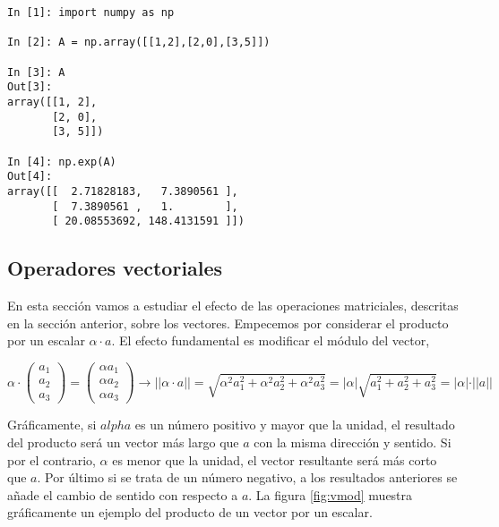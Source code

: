 \begin{center}
    \begin{minipage}{0.5\textwidth}
        \begin{verbatim}
In [1]: import numpy as np

In [2]: A = np.array([[1,2],[2,0],[3,5]])

In [3]: A
Out[3]: 
array([[1, 2],
       [2, 0],
       [3, 5]])

In [4]: np.exp(A)
Out[4]: 
array([[  2.71828183,   7.3890561 ],
       [  7.3890561 ,   1.        ],
       [ 20.08553692, 148.4131591 ]])
        \end{verbatim}
    \end{minipage}
\end{center}

\begin{paracol}{2}
\section{Operadores vectoriales}\label{opvect}
En esta sección vamos a estudiar el efecto de las operaciones matriciales, descritas en la sección anterior, sobre los vectores. Empecemos por considerar el producto por un escalar $\alpha \cdot a$. El efecto fundamental es modificar el módulo del vector,
\end{paracol}
\begin{equation*}
\alpha \cdot \begin{pmatrix}
a_1\\
a_2\\
a_3
\end{pmatrix}=
\begin{pmatrix}
\alpha a_1\\
\alpha a_2\\
\alpha a_3
\end{pmatrix}\rightarrow \vert \vert \alpha \cdot a \vert \vert =\sqrt{\alpha ^2a_1^2+\alpha ^2a_2^2+\alpha ^2a_3^2}=\vert \alpha \vert  \sqrt{a_1^2+a_2^2+a_3^2}=\vert \alpha \vert \cdot \vert \vert a \vert \vert
\end{equation*}
\begin{paracol}{2}
Gráficamente, si $alpha$ es un número positivo y mayor que la unidad, el resultado del producto será un vector más largo que $a$ con la misma dirección y sentido. Si por el contrario, $\alpha$ es menor que la unidad, el vector resultante será más corto que $a$. Por último si se trata de un número negativo, a los resultados anteriores se añade el cambio de sentido con respecto a $a$. La figura \ref{fig:vmod} muestra gráficamente un ejemplo  del producto de un vector por un escalar.
\end{paracol}
